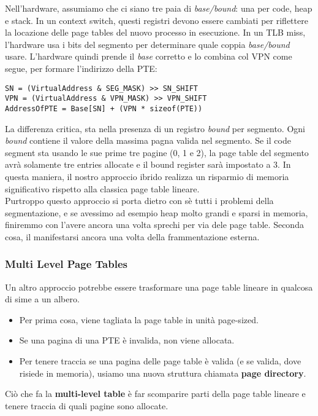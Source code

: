 \documentclass[12pt, letterpaper]{article}
\begin{document}
				Nell'hardware, assumiamo che ci siano tre paia di \textit{base/bound}: una per code, heap e stack. In un context switch, questi registri devono essere cambiati per riflettere la locazione delle page tables del nuovo processo in esecuzione. In un TLB miss, l'hardware usa i bits del segmento per determinare quale coppia \textit{base/bound} usare. L'hardware quindi prende il \textit{base} corretto e lo combina col VPN come segue, per formare l'indirizzo della PTE: 
				\begin{lstlisting}[style=CStyle]
SN = (VirtualAddress & SEG_MASK) >> SN_SHIFT
VPN = (VirtualAddress & VPN_MASK) >> VPN_SHIFT
AddressOfPTE = Base[SN] + (VPN * sizeof(PTE)) \end{lstlisting}
				La differenza critica, sta nella presenza di un registro \textit{bound} per segmento. Ogni \textit{bound} contiene il valore della massima pagna valida nel segmento. Se il code segment sta usando le sue prime tre pagine (0, 1 e 2), la page table del segmento avrà solamente tre entries allocate e il bound register sarà impostato a 3. In questa maniera, il nostro approccio ibrido realizza un risparmio di memoria significativo rispetto alla classica page table lineare.\\ 
				
				Purtroppo questo approccio si porta dietro con sè tutti i problemi della segmentazione, e se avessimo ad esempio heap molto grandi e sparsi in memoria, finiremmo con l'avere ancora una volta sprechi per via dele page table. Seconda cosa, il manifestarsi ancora una volta della frammentazione esterna. 
				
			\subsubsection{Multi Level Page Tables}
				Un altro approccio potrebbe essere trasformare una page table lineare in qualcosa di sime a un albero.
				\begin{itemize}
					\item Per prima cosa, viene tagliata la page table in unità page-sized.
					\item Se una pagina di una PTE è invalida, non viene allocata.
					\item Per tenere traccia se una pagina delle page table è valida (e se valida, dove risiede in memoria), usiamo una nuova struttura chiamata \textbf{page directory}.
				\end{itemize}
				Ciò che fa la \textbf{multi-level table} è far scomparire parti della page table lineare e tenere traccia di quali pagine sono allocate.\\
				
\end{document}
